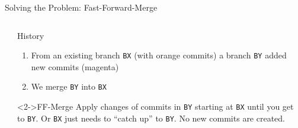 \documentclass[xetex]{beamer}
\begin{document}
\begin{frame}[fragile]{Solving the Problem: Fast-Forward-Merge}
\begin{columns}
\begin{column}{.5\linewidth}
    \end{column}
    \begin{column}{.5\linewidth}
      \begin{exampleblock}{History}
        \begin{enumerate}
          \item From an existing branch \texttt{BX} (with orange commits) a
            branch \texttt{BY} added new commits (magenta)
          \item We merge \texttt{BY} into \texttt{BX}
        \end{enumerate}
      \end{exampleblock}
      \begin{alertblock}<2->{FF-Merge}
        Apply changes of commits in \texttt{BY} starting at \texttt{BX} until
        you get to \texttt{BY}. Or \texttt{BX} just needs to ``catch up'' to
        \texttt{BY}. No new commits are created.
      \end{alertblock}
    \end{column}
  \end{columns}
\end{frame}
\end{document}
